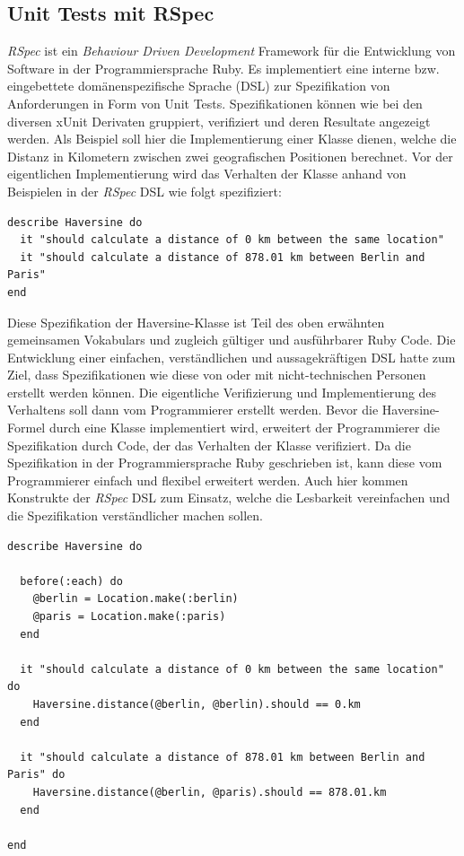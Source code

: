 \subsection{Unit Tests mit RSpec}
\textit{RSpec} \cite{rspec} ist ein \textit{Behaviour Driven Development}
Framework für die Entwicklung von Software in der Programmiersprache
Ruby.  Es implementiert eine interne bzw. eingebettete
domänen\-spezifische Sprache (DSL) zur Spezifikation von Anforderungen
in Form von Unit Tests.  Spezifikationen können wie bei den diversen
xUnit Derivaten gruppiert, verifiziert und deren Resultate angezeigt
werden. Als Beispiel soll hier die Implementierung einer Klasse
dienen, welche die Distanz in Kilometern zwischen zwei geografischen
Positionen berechnet. Vor der eigentlichen Implementierung wird das
Verhalten der Klasse anhand von Beispielen in der \textit{RSpec} DSL wie folgt
spezifiziert:

\begin{lstlisting}
describe Haversine do
  it "should calculate a distance of 0 km between the same location"
  it "should calculate a distance of 878.01 km between Berlin and Paris"
end
\end{lstlisting}

Diese Spezifikation der Haversine-Klasse ist Teil des oben erwähnten
gemeinsamen Vokabulars und zugleich gültiger und ausführbarer Ruby
Code. Die Entwicklung einer einfachen, verständlichen und
aussagekräftigen DSL hatte zum Ziel, dass Spezifikationen wie diese
von oder mit nicht-technischen Personen erstellt werden können. Die
eigentliche Verifizierung und Implementierung des Verhaltens soll dann
vom Programmierer erstellt werden. Bevor die Haversine-Formel durch
eine Klasse implementiert wird, erweitert der Programmierer die
Spezifikation durch Code, der das Verhalten der Klasse verifiziert. Da
die Spezifikation in der Programmiersprache Ruby geschrieben ist, kann
diese vom Programmierer einfach und flexibel erweitert werden. Auch
hier kommen Konstrukte der \textit{RSpec} DSL zum Einsatz, welche die
Lesbarkeit vereinfachen und die Spezifikation verständlicher machen
sollen.

\begin{lstlisting}
describe Haversine do

  before(:each) do
    @berlin = Location.make(:berlin)
    @paris = Location.make(:paris)
  end

  it "should calculate a distance of 0 km between the same location" do
    Haversine.distance(@berlin, @berlin).should == 0.km
  end

  it "should calculate a distance of 878.01 km between Berlin and Paris" do
    Haversine.distance(@berlin, @paris).should == 878.01.km
  end

end
\end{lstlisting}

